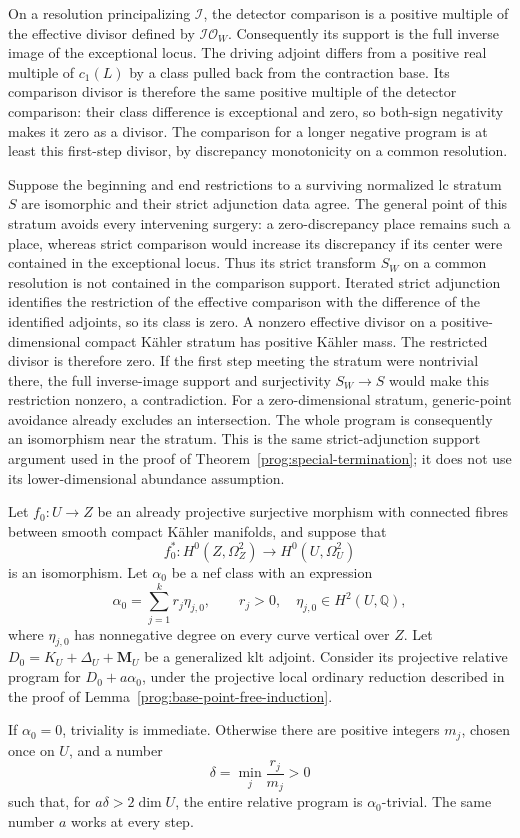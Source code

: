 On a resolution principalizing $\mathcal I$, the detector comparison
is a positive multiple of the effective divisor defined by
$\mathcal I\mathcal O_W$. Consequently its support is the full
inverse image of the exceptional locus. The driving adjoint differs
from a positive real multiple of $c_1(L)$ by a class pulled back from
the contraction base. Its comparison divisor is therefore the same
positive multiple of the detector comparison: their class difference
is exceptional and zero, so both-sign negativity makes it zero as a
divisor. The comparison for a longer
negative program is at least this first-step divisor, by discrepancy
monotonicity on a common resolution.

Suppose the beginning and end restrictions to a surviving normalized
lc stratum $S$ are isomorphic and their strict adjunction data agree.
The general point of this stratum avoids every intervening surgery:
a zero-discrepancy place remains such a place, whereas strict
comparison would increase its discrepancy if its center were contained
in the exceptional locus. Thus its strict transform $S_W$ on a common
resolution is not contained in the comparison support. Iterated strict
adjunction identifies the restriction of the effective comparison with
the difference of the identified adjoints, so its class is zero.
A nonzero effective divisor on a positive-dimensional compact K\"ahler
stratum has positive K\"ahler mass. The restricted divisor is therefore
zero. If the first step meeting the stratum were nontrivial there,
the full inverse-image support and surjectivity $S_W\to S$ would make
this restriction nonzero, a contradiction. For a zero-dimensional
stratum, generic-point avoidance already excludes an intersection.
The whole program is consequently an isomorphism near the stratum.
This is the same strict-adjunction support argument used in the proof
of Theorem~\ref{prog:special-termination}; it does not use its
lower-dimensional abundance assumption.

\begin{proposition}
\label{prog:relative-nqc-grid}
Let $f_0:U\to Z$ be an already projective surjective morphism with
connected fibres between smooth compact
K\"ahler manifolds, and suppose that
\[
 f_0^*:H^0(Z,\Omega_Z^2)\longrightarrow H^0(U,\Omega_U^2)
\]
is an isomorphism. Let $\alpha_0$ be a nef class with an expression
\[
       \alpha_0=\sum_{j=1}^k r_j\eta_{j,0},\qquad
       r_j>0,\quad \eta_{j,0}\in H^2(U,\mathbb Q),
\]
where $\eta_{j,0}$ has nonnegative degree on every curve vertical
over $Z$. Let $D_0=K_U+\Delta_U+\mathbf M_U$ be a generalized klt
adjoint. Consider its projective relative program for
$D_0+a\alpha_0$, under the projective local ordinary reduction described in the
proof of Lemma~\ref{prog:base-point-free-induction}.

If $\alpha_0=0$, triviality is immediate. Otherwise there are
positive integers $m_j$, chosen once on $U$, and a number
\[
                         \delta=\min_j\frac{r_j}{m_j}>0
\]
such that, for $a\delta>2\dim U$, the entire relative program is
$\alpha_0$-trivial. The same number $a$ works at every step.
\end{proposition}

